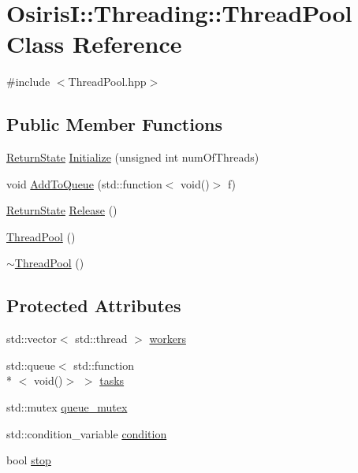 \hypertarget{class_osiris_i_1_1_threading_1_1_thread_pool}{\section{Osiris\-I\-:\-:Threading\-:\-:Thread\-Pool Class Reference}
\label{class_osiris_i_1_1_threading_1_1_thread_pool}
}


{\ttfamily \#include $<$Thread\-Pool.\-hpp$>$}

\subsection*{Public Member Functions}
\begin{DoxyCompactItemize}
\item 
\hyperlink{namespace_osiris_i_a8f53bf938dc75c65c6a529694514013e}{Return\-State} \hyperlink{class_osiris_i_1_1_threading_1_1_thread_pool_a1acccb68eabef62f08b366f91cbf3fe3}{Initialize} (unsigned int num\-Of\-Threads)
\item 
void \hyperlink{class_osiris_i_1_1_threading_1_1_thread_pool_a108adb2de8ba22c99c172ff28bd6e1fe}{Add\-To\-Queue} (std\-::function$<$ void()$>$ f)
\item 
\hyperlink{namespace_osiris_i_a8f53bf938dc75c65c6a529694514013e}{Return\-State} \hyperlink{class_osiris_i_1_1_threading_1_1_thread_pool_a9d4418bb3b727b4933b7ebeb9f5576d4}{Release} ()
\item 
\hyperlink{class_osiris_i_1_1_threading_1_1_thread_pool_a9e463fcf7bf6e5fc8b6a626e4bbc7f62}{Thread\-Pool} ()
\item 
\hyperlink{class_osiris_i_1_1_threading_1_1_thread_pool_ab2c74d28ffdd9df2feb9b519de8f4118}{$\sim$\-Thread\-Pool} ()
\end{DoxyCompactItemize}
\subsection*{Protected Attributes}
\begin{DoxyCompactItemize}
\item 
std\-::vector$<$ std\-::thread $>$ \hyperlink{class_osiris_i_1_1_threading_1_1_thread_pool_ac02477cecf8598aa185978899b6b86aa}{workers}
\item 
std\-::queue$<$ std\-::function\\*
$<$ void()$>$ $>$ \hyperlink{class_osiris_i_1_1_threading_1_1_thread_pool_ab9247637f8426897721ee766c6fac312}{tasks}
\item 
std\-::mutex \hyperlink{class_osiris_i_1_1_threading_1_1_thread_pool_a467c48f19c183557860e1ff2e6506b58}{queue\-\_\-mutex}
\item 
std\-::condition\-\_\-variable \hyperlink{class_osiris_i_1_1_threading_1_1_thread_pool_a529f0a8495fadb266bfa7f592f7188fd}{condition}
\item 
bool \hyperlink{class_osiris_i_1_1_threading_1_1_thread_pool_a6d198b51bc8c0efbff7b8a5986069ddb}{stop}
\end{DoxyCompactItemize}
